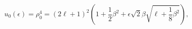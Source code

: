 \begin{equation}                              
u_{0}(\epsilon)=\rho_{0}^{4}= (2 \ell + 1)^{2} (1+\frac{1}{2} \beta^{2} +                              
\epsilon \sqrt{2} \beta                              
\sqrt{\ell+\frac{1}{8} \beta^{2}}),                              
\end{equation} 
